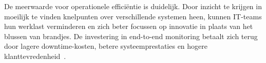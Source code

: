 De meerwaarde voor operationele efficiëntie is duidelijk. Door inzicht te krijgen in moeilijk te vinden knelpunten over verschillende systemen heen, kunnen IT-teams hun werklast verminderen en zich beter focussen op innovatie in plaats van het blussen van brandjes. De investering in end-to-end monitoring betaalt zich terug door lagere downtime-kosten, betere systeemprestaties en hogere klanttevredenheid~\autocite{Gaurav2024}.

